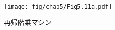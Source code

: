 \begin{figure}[tp]
\label{Figure 5.11}
\centering
\begin{comment}
\heading{Figure 5.11:} A recursive factorial machine.

\begin{example}
                             ___
                            /   \
    +----------*-----------|  =  |
    |          |            \___/
   (X)         |              ^
    |          |              |
    V          |          +---+---+   sn    +-------+
+-------+      |          |       +---(X)-->|       |
|  val  |<-(X)-|----------+   n   |         | stack |
+-----+-+      |          |       |<--(X)---+       |
  ^   |        |          +-------+   rn    +-+-----+
  |   |        |            ^                 |   ^
 (X)  |        |            |                 |   |
  |   |   +----|--------*  (X)                |  (X) sc
  |   |   |    |        |   |             rc (X)  |
  |   |   |    *----.   |   |                 |   |
  |   V   V    |    V   V   |                 V   |
  |  -------   |   -------  |              +------+-+
  |  \  *  /   |   \  -  /  |              |continue+--> controller
  |   --+--    |    --+--   |              +--------+
  |     |      |      |     |               ^      ^
  +-----+      |      +-----+               |      |
               |                           (X)    (X)
               |                            |      |
              / \                   after- / \    / \  fact-
             /_1_\                  fact  /___\  /___\ done
\end{example}

\begin{smallscheme}
(controller
   (assign continue (label fact-done))     ~\textrm{; set up final return address}~
 fact-loop
   (test (op =) (reg n) (const 1))
   (branch (label base-case))
   ~\textrm{;; Set up for the recursive call by saving \code{n} and \code{continue}.}~
   ~\textrm{;; Set up \code{continue} so that the computation will continue}~
   ~\textrm{;; at \code{after\-/fact} when the subroutine returns.}~
   (save continue)
   (save n)
   (assign n (op -) (reg n) (const 1))
   (assign continue (label after-fact))
   (goto (label fact-loop))
 after-fact
   (restore n)
   (restore continue)
   (assign val (op *) (reg n) (reg val))   ~\textrm{; \code{val} now contains}~ ~\( n(n-1)! \)~
   (goto (reg continue))                   ~\textrm{; return to caller}~
 base-case
   (assign val (const 1))                  ~\textrm{; base case: }~1! = 1
   (goto (reg continue))                   ~\textrm{; return to caller}~
 fact-done)
\end{smallscheme}

\end{comment}
\texttt{[image: fig/chap5/Fig5.11a.pdf]}
\par\bigskip
\noindent
{} 再帰階乗マシン
\end{figure}

